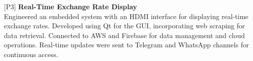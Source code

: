 \begin{cventries}
\begin{rSection}{}
{\hspace{-1.5em}[P3]\hspace{1em}}{\bodyfont\bfseries\color{darktext} {Real-Time Exchange Rate Display \hspace{1em} \href{https://www.linkedin.com/posts/mortazahassani_currency-rates-board-uml-and-images-activity-7166390758810312704-n4Oi} {\Large{\faLaptop}}}}
\\\hspace{1.2em}Engineered an embedded system with an HDMI interface for displaying real-time exchange rates. Developed using Qt for the GUI, incorporating web scraping for data retrieval. Connected to AWS and Firebase for data management and cloud operations. Real-time updates were sent to Telegram and WhatsApp channels for continuous access.
\vspace{-0.2em}
\end{rSection}


\end{cventries}
